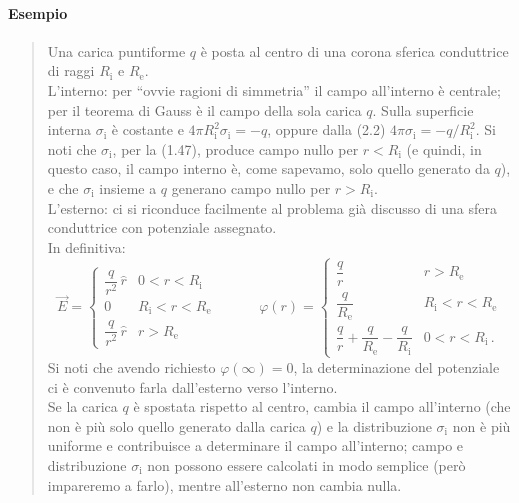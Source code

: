 \paragraph{Esempio}
\begin{quote}
  Una carica puntiforme $q$ \`e posta al centro di una corona sferica
  conduttrice di raggi $R_\mathrm{i}$ e $R_\mathrm{e}$.\\
  L'interno: per ``ovvie ragioni di simmetria'' il campo all'interno \`e
  centrale; per il teorema di Gauss \`e il campo della sola carica $q$. Sulla
  superficie interna $\sigma_\mathrm{i}$ \`e costante e
  $4\pi R_\mathrm{i}^2\sigma_\mathrm{i}=-q$, oppure dalla (2.2)
  $4\pi\sigma_\mathrm{i}=-q/R_\mathrm{i}^2$. Si noti che $\sigma_\mathrm{i}$,
  per la (1.47), produce campo nullo per $r<R_\mathrm{i}$ (e quindi, in questo
  caso, il campo interno \`e, come sapevamo, solo quello generato da $q$), e che
  $\sigma_\mathrm{i}$ insieme a $q$ generano campo nullo per $r>R_\mathrm{i}$.\\
  L'esterno: ci si riconduce facilmente al problema gi\`a discusso di una sfera
  conduttrice con potenziale assegnato.\\
  In definitiva:
  \begin{equation}
    \vec E=\begin{cases}\dfrac{q}{r^2}\,\hat r&0<r<R_\mathrm{i}\\[6pt]
    0&R_\mathrm{i}<r<R_\mathrm{e}\\[2pt]
    \dfrac{q}{r^2}\,\hat r&r>R_\mathrm{e}\end{cases}
    \qquad\quad
    \varphi(r)=\begin{cases}\dfrac qr&r>R_\mathrm{e}\\[6pt]
    \dfrac{q}{R_\mathrm{e}}&R_\mathrm{i}<r<R_\mathrm{e}\\[6pt]
    \dfrac qr+\dfrac{q}{R_\mathrm{e}}-\dfrac{q}{R_\mathrm{i}}
    &0<r<R_\mathrm{i}\,.\end{cases}
    \tag{2.5}
  \end{equation}
  Si noti che avendo richiesto $\varphi(\infty)=0$, la determinazione del
  potenziale ci \`e convenuto farla dall'esterno verso l'interno.\\
  Se la carica $q$ \`e spostata rispetto al centro, cambia il campo all'interno
  (che non \`e pi\`u solo quello generato dalla carica $q$) e la distribuzione
  $\sigma_\mathrm{i}$ non \`e pi\`u uniforme e contribuisce a determinare il
  campo all'interno; campo e distribuzione $\sigma_\mathrm{i}$ non
  possono essere calcolati in modo semplice (per\`o impareremo a farlo), mentre
  all'esterno non cambia nulla.
\end{quote}

